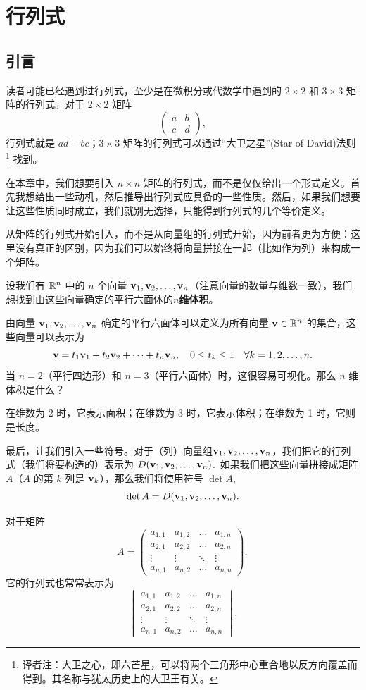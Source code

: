 
\chapter{行列式}\label{chap:03}

\section{引言}\label{sec:03-01}

读者可能已经遇到过行列式，至少是在微积分或代数学中遇到的 $2 \times 2$ 和 $3 \times 3$ 矩阵的行列式。对于 $2 \times 2$ 矩阵
$$\begin{pmatrix} a & b \\ c & d \end{pmatrix},$$
行列式就是 $ad - bc$；$3 \times 3$ 矩阵的行列式可以通过“大卫之星”(Star of David)法则
\footnote{
译者注：大卫之心，即六芒星，可以将两个三角形中心重合地以反方向覆盖而得到。其名称与犹太历史上的大卫王有关。
}
找到。

在本章中，我们想要引入 $n \times n$ 矩阵的行列式，而不是仅仅给出一个形式定义。首先我想给出一些动机，然后推导出行列式应具备的一些性质。然后，如果我们想要让这些性质同时成立，我们就别无选择，只能得到行列式的几个等价定义。

从矩阵的行列式开始引入，而不是从向量组的行列式开始，因为前者更为方便：这里没有真正的区别，因为我们可以始终将向量拼接在一起（比如作为列）来构成一个矩阵。

设我们有 $\mathbb{R}^n$ 中的 $n$ 个向量 $\mathbf{v}_1, \mathbf{v}_2, \dots, \mathbf{v}_n$（注意向量的数量与维数一致），我们想找到由这些向量确定的平行六面体的\textbf{$n$维体积}。

由向量 $\mathbf{v}_1, \mathbf{v}_2, \dots, \mathbf{v}_n$ 确定的平行六面体可以定义为所有向量 $\mathbf{v} \in \mathbb{R}^n$ 的集合，这些向量可以表示为
$$\mathbf{v} = t_1 \mathbf{v}_1 + t_2 \mathbf{v}_2 + \dots + t_n \mathbf{v}_n, \quad 0 \le t_k \le 1 \quad \forall k = 1, 2, \dots, n.$$
当 $n=2$（平行四边形）和 $n=3$（平行六面体）时，这很容易可视化。那么 $n$ 维体积是什么？

在维数为 2 时，它表示面积；在维数为 3 时，它表示体积；在维数为 1 时，它则是长度。

最后，让我们引入一些符号。对于（列）向量组$\mathbf{v}_1, \mathbf{v}_2, \dots, \mathbf{v}_n$，我们把它的行列式（我们将要构造的）表示为 $D(\mathbf{v}_1, \mathbf{v}_2, \dots, \mathbf{v}_n)$.~如果我们把这些向量拼接成矩阵 $A$（$A$ 的第 $k$ 列是 $\mathbf{v}_k$），那么我们将使用符号 $\det A$,
$$\det A = D(\mathbf{v}_1, \mathbf{v}_2, \dots, \mathbf{v}_n).$$

对于矩阵
$$A = \begin{pmatrix} a_{1,1} & a_{1,2} & \dots & a_{1,n} \\ a_{2,1} & a_{2,2} & \dots & a_{2,n} \\ \vdots & \vdots & \ddots & \vdots \\ a_{n,1} & a_{n,2} & \dots & a_{n,n} \end{pmatrix},$$
它的行列式也常常表示为
$$
\begin{vmatrix}
a_{1,1} & a_{1,2} & \dots & a_{1,n} \\
a_{2,1} & a_{2,2} & \dots & a_{2,n} \\
\vdots & \vdots & \ddots & \vdots \\
a_{n,1} & a_{n,2} & \dots & a_{n,n}
\end{vmatrix}.
$$

